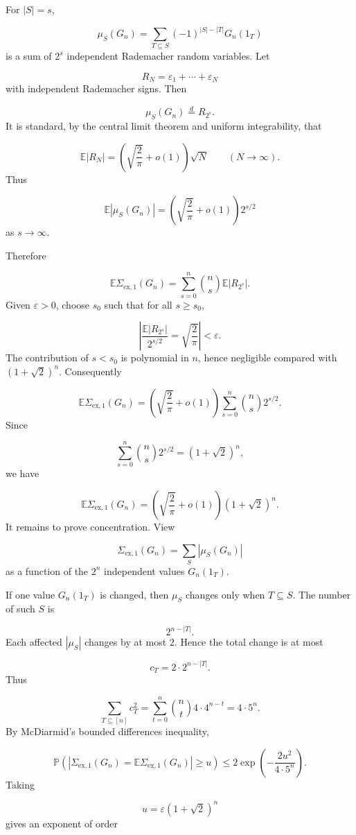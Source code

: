 \documentclass[11pt]{article}
\theoremstyle{definition}
\begin{document}
For $|S|=s$,

\[
\mu_S(G_n)
=
\sum_{T\subseteq S}
(-1)^{|S|-|T|}
G_n(1_T)
\]
is a sum of $2^s$ independent Rademacher random variables. Let

\[
R_N=\varepsilon_1+\cdots+\varepsilon_N
\]
with independent Rademacher signs. Then

\[
\mu_S(G_n)\stackrel{d}=R_{2^s}.
\]
It is standard, by the central limit theorem and uniform integrability, that

\[
\mathbb{E}|R_N|
=
\left(\sqrt{\frac2\pi}+o(1)\right)\sqrt N
\qquad(N\to\infty).
\]
Thus

\[
\mathbb{E}|\mu_S(G_n)|
=
\left(\sqrt{\frac2\pi}+o(1)\right)2^{s/2}
\]
as $s\to\infty$.

Therefore

\[
\mathbb{E}\Sigma_{\mathrm{ex},1}(G_n)
=
\sum_{s=0}^n
\binom ns
\mathbb{E}|R_{2^s}|.
\]
Given $\varepsilon>0$, choose $s_0$ such that for all $s\ge s_0$,

\[
\left|
\frac{\mathbb{E}|R_{2^s}|}{2^{s/2}}
=
\sqrt{\frac2\pi}
\right|
<\varepsilon.
\]
The contribution of $s<s_0$ is polynomial in $n$, hence negligible compared with $(1+\sqrt2)^n$. Consequently

\[
\mathbb{E}\Sigma_{\mathrm{ex},1}(G_n)
=
\left(\sqrt{\frac2\pi}+o(1)\right)
\sum_{s=0}^n\binom ns2^{s/2}.
\]
Since

\[
\sum_{s=0}^n\binom ns2^{s/2}
=
(1+\sqrt2)^n,
\]
we have

\[
\mathbb{E}\Sigma_{\mathrm{ex},1}(G_n)
=
\left(\sqrt{\frac2\pi}+o(1)\right)
(1+\sqrt2)^n.
\]
It remains to prove concentration. View

\[
\Sigma_{\mathrm{ex},1}(G_n)
=
\sum_S|\mu_S(G_n)|
\]
as a function of the $2^n$ independent values $G_n(1_T)$.

If one value $G_n(1_T)$ is changed, then $\mu_S$ changes only when $T\subseteq S$. The number of such $S$ is

\[
2^{n-|T|}.
\]
Each affected $|\mu_S|$ changes by at most $2$. Hence the total change is at most

\[
c_T=2\cdot 2^{n-|T|}.
\]
Thus

\[
\sum_{T\subseteq[n]} c_T^2
=
\sum_{t=0}^n
\binom nt
4\cdot 4^{n-t}
=
4\cdot5^n.
\]
By McDiarmid's bounded differences inequality,

\[
\mathbb{P}\left(
\left|
\Sigma_{\mathrm{ex},1}(G_n)
=
\mathbb{E}\Sigma_{\mathrm{ex},1}(G_n)
\right|
\ge u
\right)
\le
2\exp\left(
-\frac{2u^2}{4\cdot5^n}
\right).
\]
Taking

\[
u=\varepsilon(1+\sqrt2)^n
\]
gives an exponent of order
\end{document}
